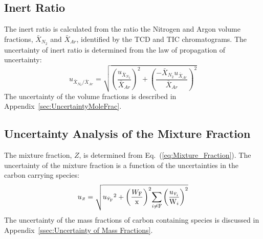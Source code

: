 \documentclass[12pt]{article}
\begin{document}
\subsection{Inert Ratio}
\label{ssec:Inert_ratio}
The inert ratio is calculated from the ratio the Nitrogen and Argon volume fractions, $\bar{X}_{N_2}$ and $\bar{X}_{Ar}$, identified by the TCD and TIC chromatograms. The uncertainty of inert ratio is determined from the law of propagation of uncertainty:
\begin{equation}
\label{eq:inert_ratio_uncertainty}
u_{\scriptscriptstyle \bar{X}_{N_2}/\bar{X}_{Ar}} = \sqrt{{\left(\frac{u_{\scriptscriptstyle \bar{X}_{N_2}}}{\bar{X}_{Ar}}\right)}^2+{\left(\frac{-\bar{X}_{N_2}u_{\scriptscriptstyle \bar{X}_{Ar}}}{\bar{X}_{Ar}}\right)}^2}
\end{equation}
The uncertainty of the volume fractions is described in Appendix~\ref{sec:UncertaintyMoleFrac}.

\pagebreak

\subsection{Uncertainty Analysis of the Mixture Fraction}\label{sec:Uncertainty_Mix_Frac}

The mixture fraction, $Z$, is determined from Eq.~(\ref{eq:Mixture_Fraction}). The uncertainty of the mixture fraction is a function of the uncertainties in the carbon carrying species:
\begin{equation}
\label{eq:mixture_frac_uncertainty}
u_{\scriptscriptstyle Z}=\sqrt{{u_{\scriptscriptstyle \bar{Y}_{\rm F}}}^2+{\left(\frac{W_{\rm F}}{\rm x}\right)}^2{\sum_{i\ne {\rm F}}{\left(\frac{u_{\scriptscriptstyle \bar{Y}_{i}}}{\textrm{W}_{i}} \right)}^2}}
\end{equation}
The uncertainty of the mass fractions of carbon containing species is discussed in Appendix~\ref{ssec:Uncertainty of Mass Fractions}.

\pagebreak
\end{document}
